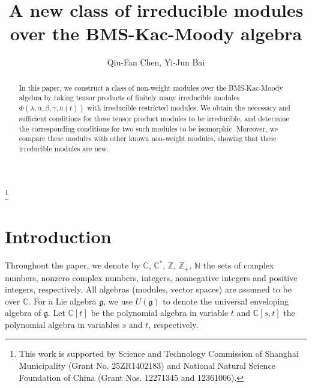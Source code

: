 \documentclass[12pt,leqno,amscd,amsfonts,amssymb]{amsart}
\def\a{\alpha}
\def\b{\beta}
\def\r{\gamma}
\def\Z{\mathbb{Z}}
\def\N{\mathbb{N}}
\def\C{\mathbb{C}}
\numberwithin{equation}{section}
\begin{document}
	
	\title[A new class of irreducible  modules over the BMS-Kac-Moody algebra]{A new class of irreducible  modules over the BMS-Kac-Moody algebra}
	
	\author{Qiu-Fan Chen, Yi-Jun Bai}
	
	\address{Department of Mathematics, Shanghai Maritime University,
		Shanghai, 201306, China.}
	
	\address{Department of Mathematics, Shanghai Maritime University,
		Shanghai, 201306, China.}
	
	
	
	\thanks{This work is supported by Science and Technology Commission of Shanghai Municipality (Grant No. 25ZR1402183) and National Natural Science Foundation of China (Grant Nos. 12271345 and 12361006).}
	
\begin{abstract}
In this paper, we construct a class of non-weight modules over the BMS-Kac-Moody algebra by taking tensor products of  finitely many  irreducible modules $\Phi(\lambda,\a,\b,\r,h(t))$ with irreducible restricted modules. We obtain the necessary and sufficient conditions for these tensor product modules to be irreducible, and determine the corresponding conditions for two such modules to be isomorphic. Moreover, we compare these modules with other known non-weight modules, showing that these irreducible modules are new.
\end{abstract}
	
\maketitle
	
\tableofcontents
	
\section{Introduction}
Throughout the paper, we denote by $\C ,\,\C^*,\,\Z,\,\Z_+,\,\N$ the sets of complex numbers, nonzero complex numbers, integers, nonnegative integers and positive integers, respectively. All algebras (modules, vector spaces) are assumed to be  over $\C$. For a Lie algebra $\mathfrak{g}$, we use $U(\mathfrak{g})$ to denote the universal enveloping algebra of $\mathfrak{g}$. Let $\C[t]$ be the polynomial algebra in variable $t$ and $\C[s,t]$ the polynomial algebra in variables $s$ and $t$, respectively.
	
\end{document}
